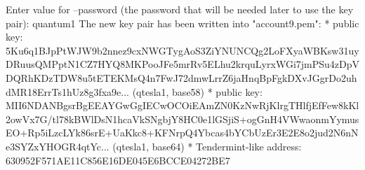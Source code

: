 \begin{shellbox}\begin{ttlst}
Enter value for --password (the password that will be needed later to use the key pair): quantum1
The new key pair has been written into "account9.pem":
* public key: 5Ku6q1BJpPtWJW9b2nnez9cxNWGTygAoS3ZiYNUNCQg2LoFXyaWBKsw31uyDRuusQMPptN1CZ7HYQ8MKPooJFe5mrRv5ELhu2krquLyrxWGi7jmPSu4zDpVDQRhKDzTDW8u5tETEKMsQ4n7FwJ72dmwLrrZ6jaHnqBpFgkDXvJGgrDo2uhdMR18ErrTs1hUz8g3fxa9e... (qtesla1, base58)
* public key: MII6NDANBgsrBgEEAYGwGgIECwOCOiEAmZN0KzNwRjKlrgTHlfjEfFew8kKl2owVx7G/tl78kBWlDsN1hcaVkSNgbjY8HC0e1lGSjiS+ogGnH4VWwaonmYymusEO+Rp5iLzcLYk86srE+UaKkc8+KFNrpQ4Ybcas4bYCbUzEr3E2E8o2jud2N6nNe3SYZxYHOGR4qtYc... (qtesla1, base64)
* Tendermint-like address: 630952F571AE11C856E16DE045E6BCCE04272BE7
\end{ttlst}\end{shellbox}

